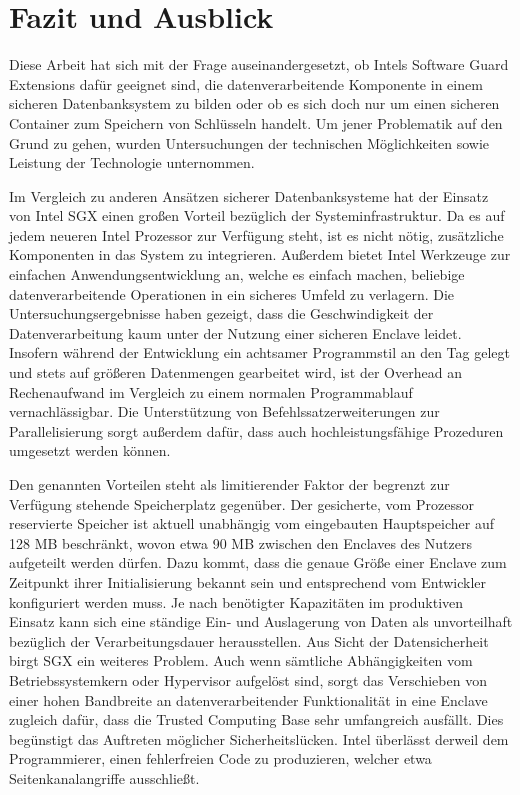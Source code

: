 
\chapter{Fazit und Ausblick}

Diese Arbeit hat sich mit der Frage auseinandergesetzt, ob Intels Software Guard Extensions dafür geeignet sind, die datenverarbeitende Komponente in einem sicheren Datenbanksystem zu bilden oder ob es sich doch nur um einen sicheren Container zum Speichern von Schlüsseln handelt. Um jener Problematik auf den Grund zu gehen, wurden Untersuchungen der technischen Möglichkeiten sowie Leistung der Technologie unternommen.

Im Vergleich zu anderen Ansätzen sicherer Datenbanksysteme hat der Einsatz von Intel \ac{SGX} einen großen Vorteil bezüglich der Systeminfrastruktur. Da es auf jedem neueren Intel Prozessor zur Verfügung steht, ist es nicht nötig, zusätzliche Komponenten in das System zu integrieren. Außerdem bietet Intel Werkzeuge zur einfachen Anwendungsentwicklung an, welche es einfach machen, beliebige datenverarbeitende Operationen in ein sicheres Umfeld zu verlagern. Die Untersuchungsergebnisse haben gezeigt, dass die Geschwindigkeit der Datenverarbeitung kaum unter der Nutzung einer sicheren Enclave leidet. Insofern während der Entwicklung ein achtsamer Programmstil an den Tag gelegt und stets auf größeren Datenmengen gearbeitet wird, ist der Overhead an Rechenaufwand im Vergleich zu einem normalen Programmablauf vernachlässigbar. Die Unterstützung von Befehlssatzerweiterungen zur Parallelisierung sorgt außerdem dafür, dass auch hochleistungsfähige Prozeduren umgesetzt werden können. 

Den genannten Vorteilen steht als limitierender Faktor der begrenzt zur Verfügung stehende Speicherplatz gegenüber. Der gesicherte, vom Prozessor reservierte Speicher ist aktuell unabhängig vom eingebauten Hauptspeicher auf 128 MB beschränkt, wovon etwa 90 MB zwischen den Enclaves des Nutzers aufgeteilt werden dürfen. Dazu kommt, dass die genaue Größe einer Enclave zum Zeitpunkt ihrer Initialisierung bekannt sein und entsprechend vom Entwickler konfiguriert werden muss. Je nach benötigter Kapazitäten im produktiven Einsatz kann sich eine ständige Ein- und Auslagerung von Daten als unvorteilhaft bezüglich der Verarbeitungsdauer herausstellen. Aus Sicht der Datensicherheit birgt \ac{SGX} ein weiteres Problem. Auch wenn sämtliche Abhängigkeiten vom Betriebssystemkern oder Hypervisor aufgelöst sind, sorgt das Verschieben von einer hohen Bandbreite an datenverarbeitender Funktionalität in eine Enclave zugleich dafür, dass die Trusted Computing Base sehr umfangreich ausfällt. Dies begünstigt das Auftreten möglicher Sicherheitslücken. Intel überlässt derweil dem Programmierer, einen fehlerfreien Code zu produzieren, welcher etwa Seitenkanalangriffe ausschließt.

